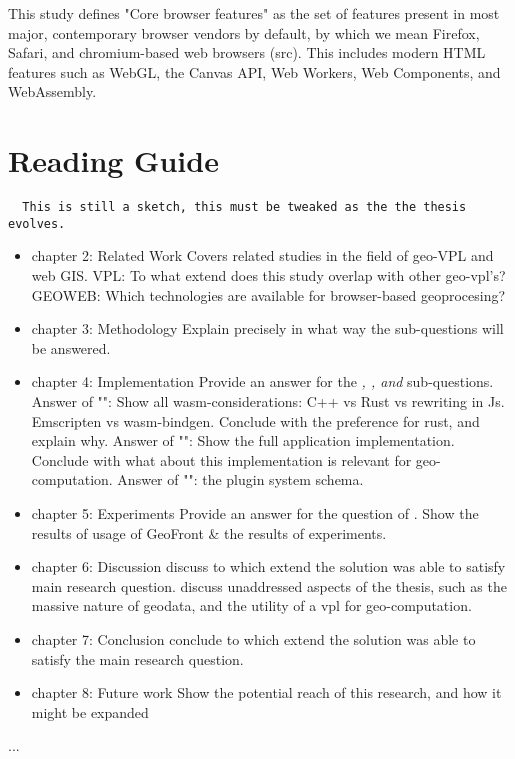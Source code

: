 This study defines "Core browser features" as the set of features present in most major, contemporary browser vendors by default, by which we mean Firefox, Safari, and chromium-based web browsers (src). 
This includes modern HTML features such as WebGL, the Canvas API, Web Workers, Web Components, and WebAssembly. 

\section{Reading Guide}

\begin{lstlisting}
  This is still a sketch, this must be tweaked as the the thesis evolves.
\end{lstlisting}

\begin{itemize}[\m{->}]

  \item chapter 2: Related Work
  \subitem Covers related studies in the field of geo-VPL and web GIS. 
  \subitem VPL: To what extend does this study overlap with other geo-vpl's? 
  \subitem GEOWEB: Which technologies are available for browser-based geoprocesing?  

  \item chapter 3: Methodology
  \subitem Explain precisely in what way the sub-questions will be answered.

  \item chapter 4: Implementation
  \subitem Provide an answer for the \textit{\mySubRQOneTitle, \mySubRQTwoTitle , and \mySubRQThreeTitle} sub-questions. 
  \subitem Answer of "\mySubRQOneTitle": Show all wasm-considerations: C++ vs Rust vs rewriting in Js. Emscripten vs wasm-bindgen. Conclude with the preference for rust, and explain why.
  \subitem Answer of "\mySubRQTwoTitle": Show the full application implementation. Conclude with what about this implementation is relevant for geo-computation. 
  \subitem Answer of "\mySubRQThreeTitle": the plugin system schema. 
  
  \item chapter 5: Experiments 
  \subitem Provide an answer for the question of \mySubRQFourTitle.
  \subitem Show the results of usage of GeoFront \& the results of experiments.

  \item chapter 6: Discussion
  \subitem discuss to which extend the solution was able to satisfy main research question.
  \subitem discuss unaddressed aspects of the thesis, such as the massive nature of geodata, and the utility of a vpl for geo-computation.

  \item chapter 7: Conclusion
  \subitem conclude to which extend the solution was able to satisfy the main research question. 
  
  \item chapter 8: Future work
  \subitem Show the potential reach of this research, and how it might be expanded

\end{itemize}

...